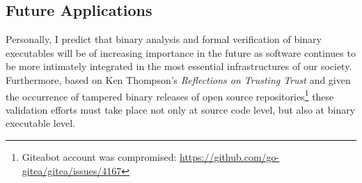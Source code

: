 
\subsection{Future Applications}

Personally, I predict that binary analysis and formal verification of binary executables will be of increasing importance in the future as software continues to be more intimately integrated in the most essential infrastructures of our society. Furthermore, based on Ken Thompson's \textit{Reflections on Trusting Trust} and given the occurrence of tampered binary releases of open source repositories\footnote{Giteabot account was compromised: \url{https://github.com/go-gitea/gitea/issues/4167}} these validation efforts must take place not only at source code level, but also at binary executable level.
